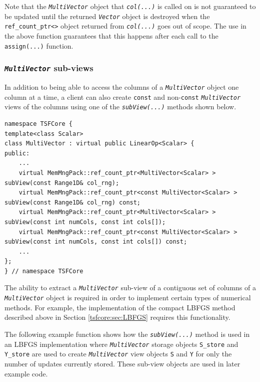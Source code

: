 Note that the \texttt{\textit{Multi\-Vector}} object that
\texttt{\textit{col(...)}} is called on is not guaranteed to be
updated until the returned \texttt{\textit{Vector}} object is
destroyed when the \texttt{ref\_count\_ptr<>} object returned from
\texttt{\textit{col(...)}} goes out of scope.  The use in the above function
guarantees that this happens after each call to the
\texttt{assign(...)} function.

%
\subsubsection{\texttt{\textit{Multi\-Vector}} sub-views}
%

In addition to being able to access the columns of a
\texttt{\textit{Multi\-Vector}} object one column at a time, a client
can also create \texttt{const} and non-\texttt{const}
\texttt{\textit{Multi\-Vector}} views of the columns
using one of the \texttt{\textit{subView(...)}} methods shown below.

{\tiny\begin{verbatim}
namespace TSFCore {
template<class Scalar>
class MultiVector : virtual public LinearOp<Scalar> {
public:
    ...
    virtual MemMngPack::ref_count_ptr<MultiVector<Scalar> >       subView(const Range1D& col_rng);
    virtual MemMngPack::ref_count_ptr<const MultiVector<Scalar> > subView(const Range1D& col_rng) const;
    virtual MemMngPack::ref_count_ptr<MultiVector<Scalar> >       subView(const int numCols, const int cols[]);
    virtual MemMngPack::ref_count_ptr<const MultiVector<Scalar> > subView(const int numCols, const int cols[]) const;
    ...
};
} // namespace TSFCore
\end{verbatim}}

The ability to extract a \texttt{\textit{Multi\-Vector}} sub-view of a
contiguous set of columns of a \texttt{\textit{Multi\-Vector}} object is
required in order to implement certain types of numerical methods.
For example, the implementation of the compact LBFGS method described
above in Section \ref{tsfcore:sec:LBFGS} requires this functionality.

The following example function shows how the
\texttt{\textit{subView(...)}} method is used in an LBFGS
implementation where \texttt{\textit{Multi\-Vector}} storage objects
\texttt{S\_store} and \texttt{Y\_store} are used to create
\texttt{\textit{Multi\-Vector}} view objects \texttt{S} and \texttt{Y}
for only the number of updates currently stored.  These sub-view
objects are used in later example code.

